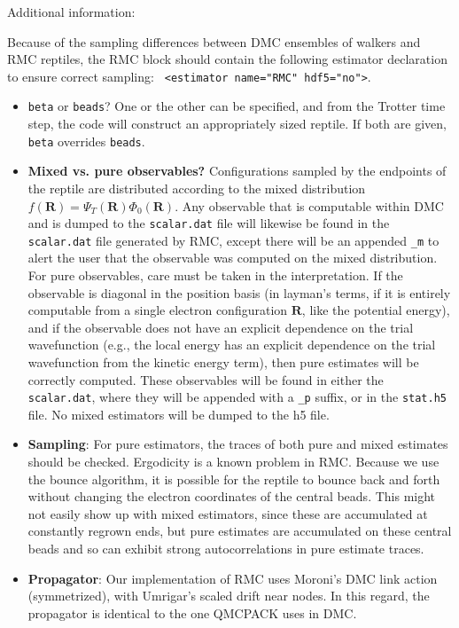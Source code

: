 Additional information:

Because of the sampling differences between DMC ensembles of walkers and RMC reptiles, the RMC block should contain the following estimator declaration to ensure correct sampling:  \texttt{ <estimator name="RMC" hdf5="no">}. 
  
\begin{itemize}
\item \texttt{beta} or \texttt{beads}?  One or the other can be specified, and from the Trotter time step, the code will construct an appropriately sized reptile.  If both are given, \texttt{beta} overrides \texttt{beads}.  

\item \textbf{Mixed vs. pure observables?}  Configurations sampled by the endpoints of the reptile are distributed according to the mixed distribution $f(\mathbf{R})=\Psi_T(\mathbf{R})\Phi_0(\mathbf{R})$.  Any observable that is computable within DMC and is dumped to the \texttt{scalar.dat} file will likewise be found in the \texttt{scalar.dat} file generated by RMC, except there will be an appended \texttt{\_m} to alert the user that the observable was computed on the mixed distribution.  For pure observables, care must be taken in the interpretation.  If the observable is diagonal in the position basis (in layman's terms, if it is entirely computable from a single electron configuration $\mathbf{R}$, like the potential energy), and if the observable does not have an explicit dependence on the trial wavefunction (e.g., the local energy has an explicit dependence on the trial wavefunction from the kinetic energy term), then pure estimates will be correctly computed.  These observables will be found in either the \texttt{scalar.dat}, where they will be appended with a \texttt{\_p} suffix, or in the \texttt{stat.h5} file.  No mixed estimators will be dumped to the h5 file. 

\item \textbf{Sampling}:  For pure estimators, the traces of both pure and mixed estimates should be checked.  Ergodicity is a known problem in RMC.  Because we use the bounce algorithm, it is possible for the reptile to bounce back and forth without changing the electron coordinates of the central beads.  This might not easily show up with mixed estimators, since these are accumulated at constantly regrown ends, but pure estimates are accumulated on these central beads and so can exhibit strong autocorrelations in pure estimate traces.  

\item \textbf{Propagator}:  Our implementation of RMC uses Moroni's DMC link action (symmetrized), with Umrigar's scaled drift near nodes.  In this regard, the propagator is identical to the one QMCPACK uses in DMC.  


\end{itemize}
